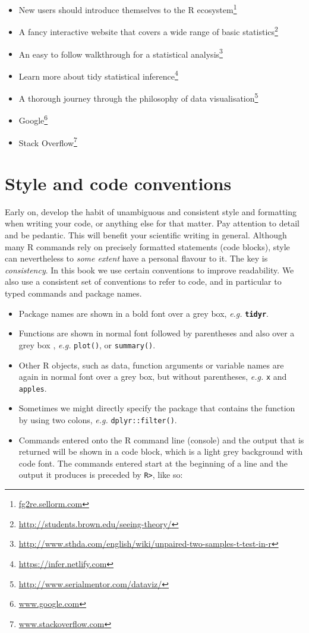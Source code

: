 \documentclass[english,10pt,a4paper,oneside]{book}
\renewcommand{\href}[2]{#2\footnote{\url{#1}}}
\let\rmarkdownfootnote\footnote%
\def\footnote{\protect\rmarkdownfootnote}
\providecommand{\tightlist}{%
  \setlength{\itemsep}{0pt}\setlength{\parskip}{0pt}}
\theoremstyle{definition}
\theoremstyle{definition}
\theoremstyle{definition}
\theoremstyle{remark}
\begin{document}
\begin{itemize}
\tightlist
\item
  New users should introduce themselves to the
  \href{fg2re.sellorm.com}{R ecosystem}
\item
  A fancy interactive website that covers a wide range of
  \href{http://students.brown.edu/seeing-theory/}{basic statistics}
\item
  An easy to follow walkthrough for a
  \href{http://www.sthda.com/english/wiki/unpaired-two-samples-t-test-in-r}{statistical
  analysis}
\item
  Learn more about \href{https://infer.netlify.com}{tidy statistical
  inference}
\item
  A thorough journey through the philosophy of
  \href{http://www.serialmentor.com/dataviz/}{data visualisation}
\item
  \href{www.google.com}{Google}
\item
  \href{www.stackoverflow.com}{Stack Overflow}
\end{itemize}

\section{Style and code conventions}\label{style-and-code-conventions}

Early on, develop the habit of unambiguous and consistent style and
formatting when writing your code, or anything else for that matter. Pay
attention to detail and be pedantic. This will benefit your scientific
writing in general. Although many R commands rely on precisely formatted
statements (code blocks), style can nevertheless to \emph{some extent}
have a personal flavour to it. The key is \emph{consistency}. In this
book we use certain conventions to improve readability. We also use a
consistent set of conventions to refer to code, and in particular to
typed commands and package names.

\begin{itemize}
\tightlist
\item
  Package names are shown in a bold font over a grey box, \emph{e.g.}
  \textbf{\texttt{tidyr}}.
\item
  Functions are shown in normal font followed by parentheses and also
  over a grey box , \emph{e.g.} \texttt{plot()}, or \texttt{summary()}.
\item
  Other R objects, such as data, function arguments or variable names
  are again in normal font over a grey box, but without parentheses,
  \emph{e.g.} \texttt{x} and \texttt{apples}.
\item
  Sometimes we might directly specify the package that contains the
  function by using two colons, \emph{e.g.} \texttt{dplyr::filter()}.
\item
  Commands entered onto the R command line (console) and the output that
  is returned will be shown in a code block, which is a light grey
  background with code font. The commands entered start at the beginning
  of a line and the output it produces is preceded by
  \texttt{R\textgreater{}}, like so:
\end{itemize}
\end{document}
